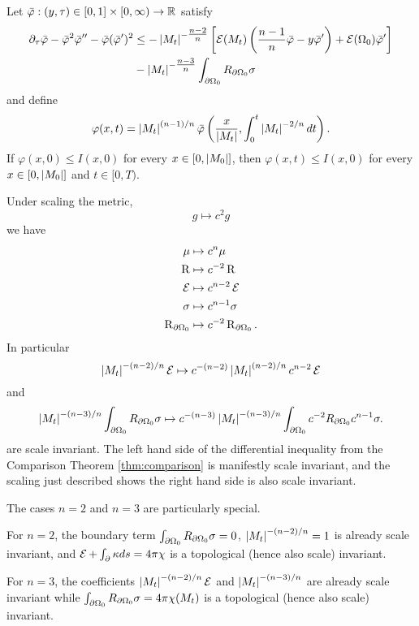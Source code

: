 \documentclass{amsart}
\begin{document}
\begin{thm}
\label{thm:comparison}
Let \(\bar{\varphi} : (y, \tau) \in [0, 1] \times [0, \infty) \to \mathbb{R}\) satisfy
\[
\begin{split}
\partial_{\tau} \bar{\varphi} - \bar{\varphi}^2 \bar{\varphi}'' - \bar{\varphi}(\bar{\varphi}')^2 &\leq -\left|{M_t}\right|^{-\tfrac{n-2}{n}} \left[\operatorname{\mathcal{E}}(M_t)\left(\frac{n-1}{n} \bar{\varphi} - y \bar{\varphi}'\right) + \operatorname{\mathcal{E}}(\Omega_0)\bar{\varphi}'\right] \\
&- \left|{M_t}\right|^{-\tfrac{n-3}{n}}\int_{\partial {\Omega_0}} R_{\partial {\Omega_0}}\sigma
\end{split}
\]
and define
\[
\varphi(x, t) = \left|{M_t}\right|^{(n-1)/n} \bar{\varphi} \left(\frac{x}{\left|{M_t}\right|}, \int_0^t \left|{M_t}\right|^{-2/n} dt\right).
\]
If \(\varphi(x, 0) \leq I(x, 0)\) for every \(x \in [0, \left|{M_0}\right|]\), then \(\varphi(x, t) \leq I(x, 0)\) for every \(x \in [0, \left|{M_0}\right|]\) and \(t \in [0, T)\).
\end{thm}

\begin{rem}
\label{rem:scaling}
Under scaling the metric,
\[
g \mapsto c^2 g
\]
we have
\begin{align*}
\mu &\mapsto c^n \mu \\
\operatorname{R} &\mapsto c^{-2} \operatorname{R} \\
\operatorname{\mathcal{E}} &\mapsto c^{n-2} \operatorname{\mathcal{E}} \\
\sigma &\mapsto c^{n-1} \sigma \\
\operatorname{R}_{\partial {\Omega_0}} &\mapsto c^{-2} \operatorname{R}_{\partial {\Omega_0}}.
\end{align*}
In particular
\[
\left|{M_t}\right|^{-(n-2)/n} \operatorname{\mathcal{E}} \mapsto c^{-(n-2)} \left|{M_t}\right|^{(n-2)/n} c^{n-2}\operatorname{\mathcal{E}}
\]
and
\[
\left|{M_t}\right|^{-(n-3)/n} \int_{\partial {\Omega_0}} R_{\partial {\Omega_0}}\sigma \mapsto c^{-(n-3)} \left|{M_t}\right|^{-(n-3)/n} \int_{\partial {\Omega_0}} c^{-2} R_{\partial {\Omega_0}} c^{n-1}\sigma.
\]
are scale invariant. The left hand side of the differential inequality from the Comparison Theorem \ref{thm:comparison} is manifestly scale invariant, and the scaling just described shows the right hand side is also scale invariant.

The cases \(n = 2\) and \(n = 3\) are particularly special.

For \(n=2\), the boundary term \(\int_{\partial {\Omega_0}} R_{\partial {\Omega_0}}\sigma = 0\), \(\left|{M_t}\right|^{-(n-2)/n} = 1\) is already scale invariant, and \(\einsteinhilbert + \int_{\bdry{\empty}} \kappa ds = 4\pi \chi\) is a topological (hence also scale) invariant.

For \(n=3\), the coefficients \(\left|{M_t}\right|^{-(n-2)/n} \operatorname{\mathcal{E}}\) and \(\left|{M_t}\right|^{-(n-3)/n}\) are already scale invariant while \(\int_{\partial {\Omega_0}} R_{\partial {\Omega_0}}\sigma = 4\pi \chi(M_t)\) is a topological (hence also scale) invariant.
\end{rem}
\end{document}
